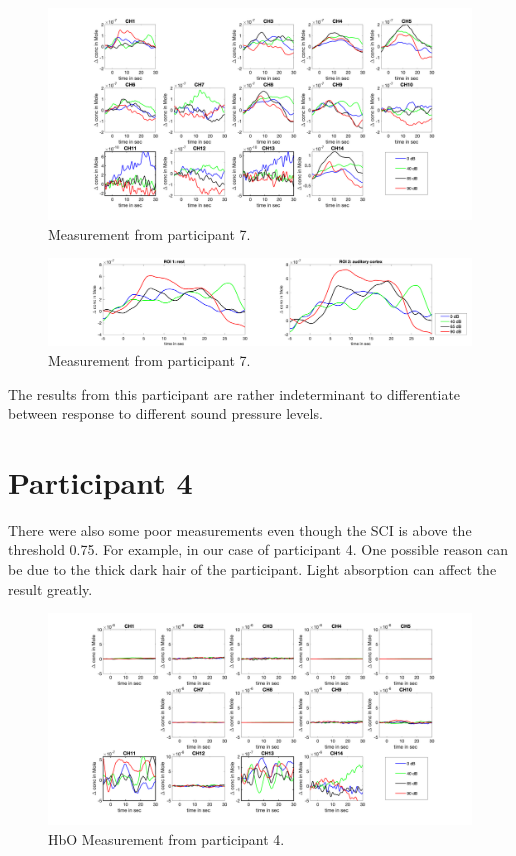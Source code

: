 \begin{figure}[H]
  \centering
    \includegraphics[scale=.4]{bilder/HbR_Mole/sub_liao_s_HbR.png}
  \caption{Measurement from participant 7.}
  \label{fig:somesignal}
\end{figure}

\begin{figure}[H]
  \centering
    \includegraphics[scale=.29]{bilder/ROI/sub_liao_s_HbO.png}
  \caption{Measurement from participant 7.}
\end{figure}

The results from this participant are rather indeterminant to differentiate between response to different sound pressure levels.

\newpage



\section {Participant 4}
There were also some poor measurements even though the SCI is above the threshold 0.75. For example, in our case of participant 4. One possible reason can be due to the thick dark hair of the participant. Light absorption can affect the result greatly.

\begin{figure}[H]
  \centering
    \includegraphics[scale=.35]{bilder/HbO_Mole/sub_lin_s_HbO.png}
  \caption{HbO Measurement from participant 4.}
\end{figure}


